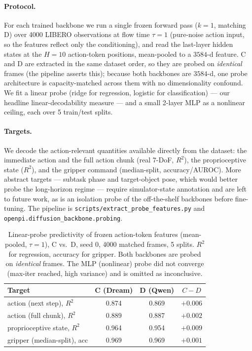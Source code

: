 \documentclass{article}
\begin{document}
\paragraph{Protocol.} For each trained backbone we run a single frozen forward
pass ($k{=}1$, matching D) over 4000 LIBERO observations at flow time $\tau{=}1$
(pure-noise action input, so the features reflect only the conditioning), and read
the last-layer hidden states at the $H{=}10$ action-token positions, mean-pooled
to a $3584$-d feature. C and D are extracted in the same dataset order, so they are
probed on \emph{identical} frames (the pipeline asserts this); because both
backbones are $3584$-d, one probe architecture is capacity-matched across them with
no dimensionality confound. We fit a linear probe (ridge for regression, logistic
for classification) --- our headline linear-decodability measure --- and a small
2-layer MLP as a nonlinear ceiling, each over 5 train/test splits.

\paragraph{Targets.} We decode the action-relevant quantities available directly
from the dataset: the immediate action and the full action chunk (real 7-DoF,
$R^2$), the proprioceptive state ($R^2$), and the gripper command (median-split,
accuracy/AUROC). More abstract targets --- subtask phase and target-object pose,
which would better probe the long-horizon regime --- require simulator-state
annotation and are left to future work, as is an isolation probe of the
off-the-shelf backbones before fine-tuning. The pipeline is
\texttt{scripts/extract\_probe\_features.py} and
\texttt{openpi.diffusion\_backbone.probing}.

\begin{table}[t]
\centering
\caption{Linear-probe predictivity of frozen action-token features (mean-pooled,
$\tau{=}1$), C vs.\ D, seed 0, 4000 matched frames, 5 splits. $R^2$ for
regression, accuracy for gripper. Both backbones are probed on \emph{identical}
frames. The MLP (nonlinear) probe did not converge (max-iter reached, high
variance) and is omitted as inconclusive.}
\label{tab:probing}
\begin{tabular}{lccc}
\toprule
Target & C (Dream) & D (Qwen) & $C-D$ \\
\midrule
action (next step), $R^2$      & 0.874 & 0.869 & $+0.006$ \\
action (full chunk), $R^2$     & 0.889 & 0.887 & $+0.002$ \\
proprioceptive state, $R^2$    & 0.964 & 0.954 & $+0.009$ \\
gripper (median-split), acc    & 0.969 & 0.969 & $+0.001$ \\
\bottomrule
\end{tabular}
\end{table}
\end{document}
